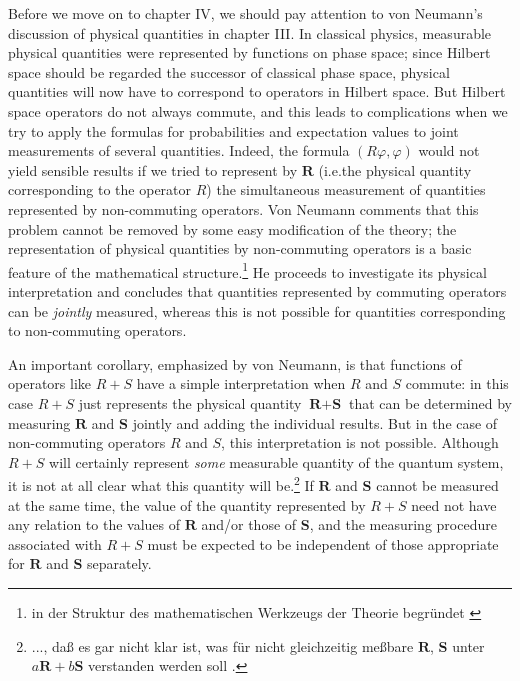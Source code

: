 \documentclass[12pt]{article}
\begin{document}
Before we move on to chapter IV, we should pay attention to von Neumann's discussion of physical quantities in chapter III. In classical physics, measurable physical quantities were represented by functions on phase space; since Hilbert space should be regarded the successor of classical phase space, physical quantities will now have to correspond to operators in Hilbert space. But Hilbert space operators do not always commute, and this leads to complications when we try to apply the formulas for probabilities and expectation values to joint measurements of several quantities. Indeed, the formula $(R\varphi, \varphi)$ would not yield sensible results if we tried to represent by $\textbf{R}$ (i.e.\@ the physical quantity corresponding to the operator $R$) the simultaneous measurement of quantities represented by non-commuting operators. Von Neumann comments that this problem cannot be removed by some easy modification of the theory; the representation of physical quantities by non-commuting operators is a basic feature of the mathematical structure.\footnote{in der Struktur des mathematischen Werkzeugs der Theorie begr\"{u}ndet \cite[p.\@ 110]{VN1}} He proceeds to investigate its physical interpretation and concludes that quantities represented by commuting operators can be \emph{jointly} measured, whereas this is not possible for quantities corresponding to non-commuting operators.

An important corollary, emphasized by von Neumann, is that functions of operators like $R + S$ have a simple interpretation when $R$ and $S$ commute: in this case $R + S$ just represents the physical quantity $\textbf{R} + \textbf{S}$ that can be determined by measuring $\textbf{R}$ and $\textbf{S}$ jointly and adding the individual results. But in the case of non-commuting operators $R$ and $S$, this interpretation is not possible. Although $R + S$ will certainly represent \emph{some} measurable quantity of the quantum system, it is not at all clear what this quantity will be.\footnote{..., da{\ss} es gar nicht klar ist, was f\"{u}r nicht gleichzeitig me{\ss}bare $\textbf{R}$, $\textbf{S}$ unter $a\textbf{R} + b\textbf{S}$ verstanden werden soll \cite[p.\@ 131]{VN1}.} If $\textbf{R}$ and $\textbf{S}$ cannot be measured at the same time, the value of the quantity represented by $R + S$ need not have any relation to the values of $\textbf{R}$ and/or those of $\textbf{S}$, and the measuring procedure associated with $R + S$ must be expected to be independent of those appropriate for $\textbf{R}$ and $\textbf{S}$ separately.
\end{document}
